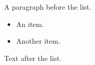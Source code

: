 \documentclass[10pt]{beamer}
\begin{document}
\begin{frame}
A paragraph before the list.
\begin{itemize}
\item An item.
\item Another item.
\end{itemize}
Text after the list.
\end{frame}
\end{document}
